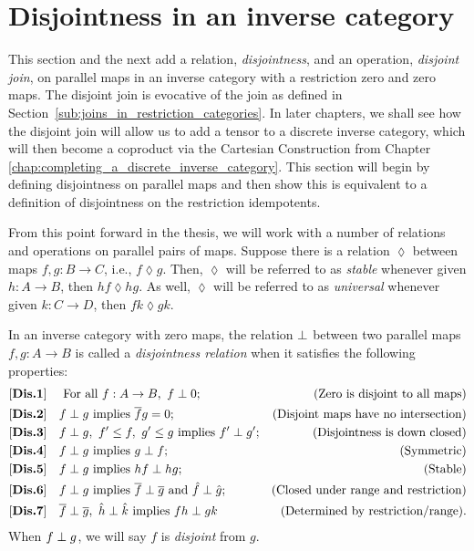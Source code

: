 \section{Disjointness in an inverse category} %
\label{sec:disjointness_in_an_inverse_category}
This section and the next add a relation, \emph{disjointness}, and an operation, \emph{disjoint
  join}, on parallel maps in  an inverse category with a restriction zero and zero maps. The
disjoint join is evocative of the join as defined in
Section~\ref{sub:joins_in_restriction_categories}. In later chapters, we shall see how the disjoint
join will allow us to add a tensor to a discrete inverse category, which will then become a
coproduct via the Cartesian Construction from Chapter
\ref{chap:completing_a_discrete_inverse_category}.
This section will begin by defining disjointness on parallel maps and then show this is equivalent
to a definition of disjointness on the restriction idempotents.

From this point forward in the thesis, we will work with a number of relations and operations on
parallel pairs of maps. Suppose there is a relation $\lozenge$ between maps $f,g:B\to C$, i.e.,
$f \lozenge g$. Then, $\lozenge$ will be referred to as \emph{stable} whenever given $h:A \to B$,
then $h f \lozenge h g$. As well, $\lozenge$ will be referred to as \emph{universal} whenever given
$k:C \to D$, then $f k \lozenge g k$.


\begin{definition}\label{def:disjointness_relation}
  In an inverse category \X with zero maps, the relation $\perp$ between two parallel
  maps $f, g:A \to B$ is called a \emph{disjointness relation} when it satisfies the following
  properties:
  \begin{align*}
    \axiom{Dis}{1}\quad &\text{ For all }f:A\to B,\ f\cdperp 0;&\text{(Zero is disjoint to all maps)}\\
    \axiom{Dis}{2}\quad &f\cdperp g\text{ implies }\rst{f} g = 0; &\text{(Disjoint maps have no intersection)}\\
    \axiom{Dis}{3}\quad &f\cdperp g,\ f' \le f,\ g' \le g\text{ implies }f' \cdperp
    g';&\text{(Disjointness is down closed)}\\
    \axiom{Dis}{4}\quad &f\cdperp g\text{ implies }g \cdperp f; &\text{(Symmetric)}\\
    \axiom{Dis}{5}\quad &f\cdperp g\text{ implies }h f \cdperp h g; &\text{(Stable)}\\
    \axiom{Dis}{6}\quad &f\cdperp g\text{ implies }\rst{f} \cdperp \rst{g}
      \text{ and }\rg{f}\cdperp\rg{g}; &\text{(Closed under range and restriction)}\\
    \axiom{Dis}{7}\quad &\rst{f}\cdperp \rst{g},\ \rg{h}\cdperp \rg{k}\text{ implies }f h
      \cdperp g k &\text{(Determined by restriction/range).}
  \end{align*}
  When $f\perp g$, we will say $f$ is \emph{disjoint} from $g$.
\end{definition}

